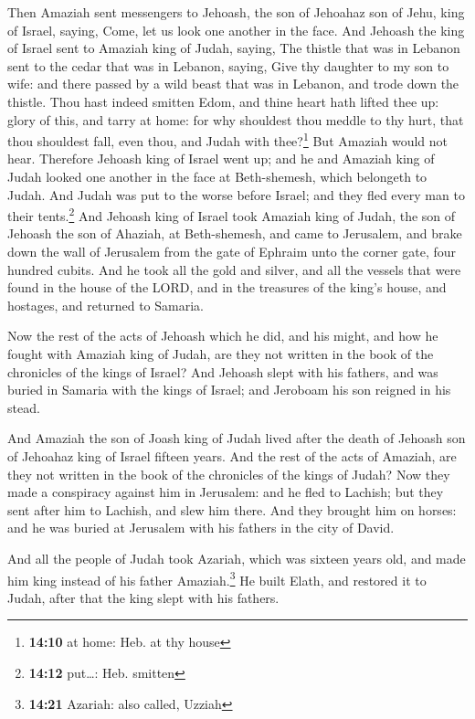  Then Amaziah sent messengers to Jehoash, the son of
Jehoahaz son of Jehu, king of Israel, saying, Come, let us look one
another in the face.  And Jehoash the king of Israel sent
to Amaziah king of Judah, saying, The thistle that was in Lebanon sent
to the cedar that was in Lebanon, saying, Give thy daughter to my son to
wife: and there passed by a wild beast that was in Lebanon, and trode
down the thistle.  Thou hast indeed smitten Edom, and
thine heart hath lifted thee up: glory of this, and tarry at home: for
why shouldest thou meddle to thy hurt, that thou shouldest fall, even
thou, and Judah with thee?\footnote{\textbf{14:10} at home: Heb. at thy
  house}  But Amaziah would not hear. Therefore Jehoash
king of Israel went up; and he and Amaziah king of Judah looked one
another in the face at Beth-shemesh, which belongeth to Judah.
 And Judah was put to the worse before Israel; and they
fled every man to their tents.\footnote{\textbf{14:12} put\ldots: Heb.
  smitten}  And Jehoash king of Israel took Amaziah king
of Judah, the son of Jehoash the son of Ahaziah, at Beth-shemesh, and
came to Jerusalem, and brake down the wall of Jerusalem from the gate of
Ephraim unto the corner gate, four hundred cubits.  And
he took all the gold and silver, and all the vessels that were found in
the house of the LORD, and in the treasures of the king's house, and
hostages, and returned to Samaria.

 Now the rest of the acts of Jehoash which he did, and
his might, and how he fought with Amaziah king of Judah, are they not
written in the book of the chronicles of the kings of Israel?
 And Jehoash slept with his fathers, and was buried in
Samaria with the kings of Israel; and Jeroboam his son reigned in his
stead.

 And Amaziah the son of Joash king of Judah lived after
the death of Jehoash son of Jehoahaz king of Israel fifteen years.
 And the rest of the acts of Amaziah, are they not
written in the book of the chronicles of the kings of Judah?
 Now they made a conspiracy against him in Jerusalem: and
he fled to Lachish; but they sent after him to Lachish, and slew him
there.  And they brought him on horses: and he was buried
at Jerusalem with his fathers in the city of David.

 And all the people of Judah took Azariah, which was
sixteen years old, and made him king instead of his father
Amaziah.\footnote{\textbf{14:21} Azariah: also called, Uzziah}
 He built Elath, and restored it to Judah, after that the
king slept with his fathers.

